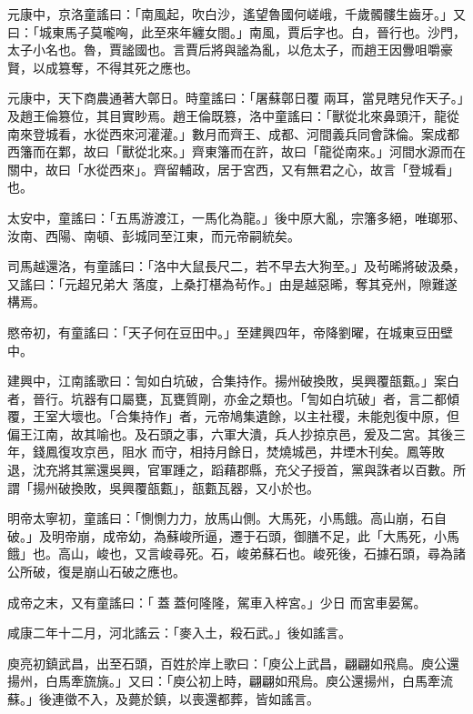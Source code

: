 \begin{pinyinscope}
 元康中，京洛童謠曰：「南風起，吹白沙，遙望魯國何嵯峨，千歲髑髏生齒牙。」又曰：「城東馬子莫嚨哅，此至來年纏女閤。」南風，賈后字也。白，晉行也。沙門，太子小名也。魯，賈謐國也。言賈后將與謐為亂，以危太子，而趙王因釁咀嚼豪賢，以成篡奪，不得其死之應也。



 元康中，天下商農通著大鄣日。時童謠曰：「屠蘇鄣日覆
 兩耳，當見瞎兒作天子。」及趙王倫篡位，其目實眇焉。趙王倫既篡，洛中童謠曰：「獸從北來鼻頭汗，龍從南來登城看，水從西來河灌灌。」數月而齊王、成都、河間義兵同會誅倫。案成都西籓而在鄴，故曰「獸從北來。」齊東籓而在許，故曰「龍從南來。」河間水源而在關中，故曰「水從西來」。齊留輔政，居于宮西，又有無君之心，故言「登城看」也。



 太安中，童謠曰：「五馬游渡江，一馬化為龍。」後中原大亂，宗籓多絕，唯瑯邪、汝南、西陽、南頓、彭城同至江東，而元帝嗣統矣。



 司馬越還洛，有童謠曰：「洛中大鼠長尺二，若不早去大狗至。」及茍晞將破汲桑，又謠曰：「元超兄弟大
 落度，上桑打椹為茍作。」由是越惡晞，奪其兗州，隙難遂構焉。



 愍帝初，有童謠曰：「天子何在豆田中。」至建興四年，帝降劉曜，在城東豆田壁中。



 建興中，江南謠歌曰：訇如白坑破，合集持作。揚州破換敗，吳興覆瓿甊。」案白者，晉行。坑器有口屬甕，瓦甕質剛，亦金之類也。「訇如白坑破」者，言二都傾覆，王室大壞也。「合集持作」者，元帝鳩集遺餘，以主社稷，未能剋復中原，但偏王江南，故其喻也。及石頭之事，六軍大潰，兵人抄掠京邑，爰及二宮。其後三年，錢鳳復攻京邑，阻水
 而守，相持月餘日，焚燒城邑，井堙木刊矣。鳳等敗退，沈充將其黨還吳興，官軍踵之，蹈藉郡縣，充父子授首，黨與誅者以百數。所謂「揚州破換敗，吳興覆瓿甊」，瓿甊瓦器，又小於也。



 明帝太寧初，童謠曰：「惻惻力力，放馬山側。大馬死，小馬餓。高山崩，石自破。」及明帝崩，成帝幼，為蘇峻所逼，遷于石頭，御膳不足，此「大馬死，小馬餓」也。高山，峻也，又言峻尋死。石，峻弟蘇石也。峻死後，石據石頭，尋為諸公所破，復是崩山石破之應也。



 成帝之末，又有童謠曰：「蓋蓋何隆隆，駕車入梓宮。」少日
 而宮車晏駕。



 咸康二年十二月，河北謠云：「麥入土，殺石武。」後如謠言。



 庾亮初鎮武昌，出至石頭，百姓於岸上歌曰：「庾公上武昌，翩翩如飛鳥。庾公還揚州，白馬牽旒旐。」又曰：「庾公初上時，翩翩如飛烏。庾公還揚州，白馬牽流蘇。」後連徵不入，及薨於鎮，以喪還都葬，皆如謠言。




\end{pinyinscope}
